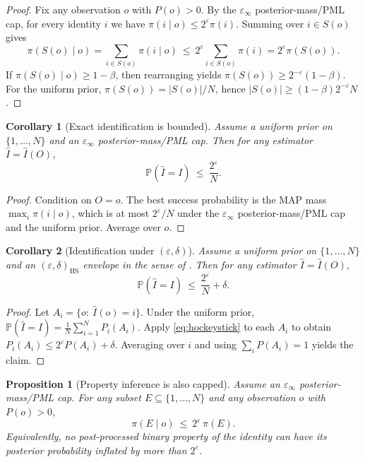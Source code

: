 \documentclass[11pt]{article}
\newcommand{\PP}{\mathbb{P}}
\newtheorem{proposition}{Proposition}
\newtheorem{corollary}{Corollary}
\theoremstyle{definition}
\theoremstyle{remark}
\begin{document}
\begin{proof}
Fix any observation $o$ with $P(o)>0$.
By the $\varepsilon_\infty$ posterior-mass/PML cap, for every identity $i$ we have $\pi(i\mid o)\le 2^{\varepsilon}\pi(i)$.
Summing over $i\in S(o)$ gives
\[
\pi(S(o)\mid o)=\sum_{i\in S(o)}\pi(i\mid o)\ \le\ 2^{\varepsilon}\sum_{i\in S(o)}\pi(i)=2^{\varepsilon}\pi(S(o)).
\]
If $\pi(S(o)\mid o)\ge 1-\beta$, then rearranging yields $\pi(S(o))\ge 2^{-\varepsilon}(1-\beta)$.
For the uniform prior, $\pi(S(o))=|S(o)|/N$, hence $|S(o)|\ge (1-\beta)2^{-\varepsilon}N$.
\end{proof}

\begin{corollary}[Exact identification is bounded]\label{cor:identification}
Assume a uniform prior on $\{1,\dots,N\}$ and an $\varepsilon_\infty$ posterior-mass/PML cap.
Then for any estimator $\widehat I=\widehat I(O)$,
\[
\PP(\widehat I=I)\ \le\ \frac{2^{\varepsilon}}{N}.
\]
\end{corollary}

\begin{proof}
Condition on $O=o$.
The best success probability is the MAP mass $\max_i\pi(i\mid o)$, which is at most $2^{\varepsilon}/N$ under the $\varepsilon_\infty$ posterior-mass/PML cap and the uniform prior.
Average over $o$.
\end{proof}


\begin{corollary}[Identification under $(\varepsilon,\delta)$]\label{cor:identification_epsdelta}
Assume a uniform prior on $\{1,\dots,N\}$ and an $(\varepsilon,\delta)_{\mathrm{HS}}$ envelope in the sense of .
Then for any estimator $\widehat I=\widehat I(O)$,
\[
\PP(\widehat I=I)\ \le\ \frac{2^{\varepsilon}}{N}+\delta.
\]
\end{corollary}

\begin{proof}
Let $A_i=\{o:\ \widehat I(o)=i\}$.
Under the uniform prior, $\PP(\widehat I=I)=\frac{1}{N}\sum_{i=1}^N P_i(A_i)$.
Apply \eqref{eq:hockeystick} to each $A_i$ to obtain $P_i(A_i)\le 2^\varepsilon P(A_i)+\delta$.
Averaging over $i$ and using $\sum_i P(A_i)=1$ yields the claim.
\end{proof}



\begin{proposition}[Property inference is also capped]\label{prop:property}
Assume an $\varepsilon_\infty$ posterior-mass/PML cap. For any subset $E\subseteq\{1,\dots,N\}$ and any observation $o$ with $P(o)>0$,
\[
\pi(E\mid o)\ \le\ 2^{\varepsilon}\,\pi(E).
\]
Equivalently, no post-processed binary property of the identity can have its posterior probability inflated by more than $2^{\varepsilon}$.
\end{proposition}
\end{document}
